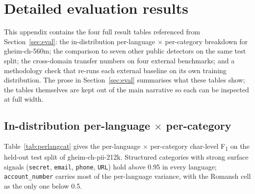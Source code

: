 \documentclass[sigconf,nonacm]{acmart}
\begin{document}



\appendix

\section{Detailed evaluation results}
\label{app:results}

This appendix contains the four full result tables referenced from
Section~\ref{sec:eval}: the in-distribution per-language $\times$
per-category breakdown for \textsf{gheim-ch-560m}; the comparison to
seven other public detectors on the same test split; the cross-domain
transfer numbers on four external benchmarks; and a methodology
check that re-runs each external baseline on its own training
distribution. The prose in Section~\ref{sec:eval} summarises what
these tables show; the tables themselves are kept out of the main
narrative so each can be inspected at full width.

\subsection{In-distribution per-language $\times$ per-category}
\label{app:perlangcat}

Table~\ref{tab:perlangcat} gives the per-language $\times$ per-category
char-level F\textsubscript{1} on the held-out test split of
\textsf{gheim-ch-pii-212k}. Structured categories with strong surface
signals (\texttt{secret}, \texttt{email}, \texttt{phone},
\texttt{URL}) hold above 0.95 in every language;
\texttt{account\_number} carries most of the per-language variance,
with the Romansh cell as the only one below 0.5.
\end{document}
